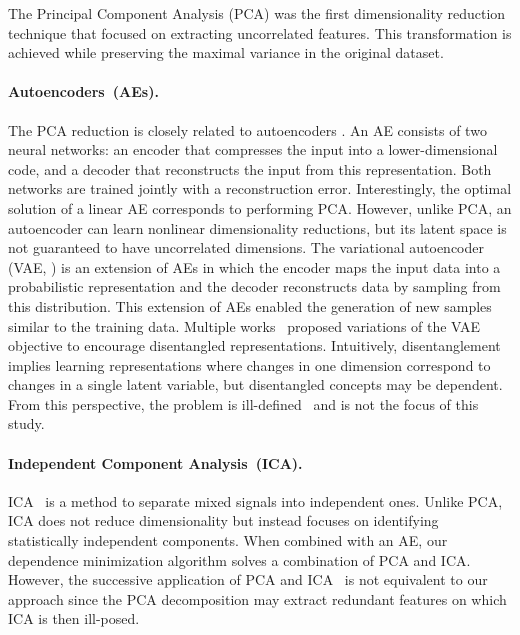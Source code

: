 The Principal Component Analysis (PCA) was the first dimensionality reduction technique that focused on extracting uncorrelated features. 
This transformation is achieved while preserving the maximal variance in the original dataset.

\paragraph{Autoencoders~(AEs).} The PCA reduction is closely related to autoencoders \citep{kramer1991autoencoder_nlpca, rumelhart1986ae_structure}. 
An AE consists of two neural networks: an encoder that compresses the input into a lower-dimensional code, and a decoder that reconstructs the input from this representation. 
Both networks are trained jointly with a reconstruction error. 
Interestingly, the optimal solution of a linear AE corresponds to performing PCA. 
However, unlike PCA, an autoencoder can learn nonlinear dimensionality reductions, but its latent space is not guaranteed to have uncorrelated dimensions. 
The variational autoencoder (VAE, \cite{kingma2013VAE}) is an extension of AEs in which the encoder maps the input data into a probabilistic representation and the decoder reconstructs data by sampling from this distribution. %
This extension of AEs enabled the generation of new samples similar to the training data. 
Multiple works~\citep{higgins2022beta_vae, burgess2018understand_beta_vae, kim2018factor_vae, chen2018tc_vae} proposed variations of the VAE objective to encourage disentangled representations. Intuitively, disentanglement implies learning representations where changes in one dimension correspond to changes in a single latent variable, but disentangled concepts may be dependent. 
From this perspective, the problem is ill-defined~\citep{locatello2019challenging_disentanglement} and is not the focus of this study. 

\paragraph{Independent Component Analysis~(ICA).} 
ICA~\citep{jutten1991ica_bss} is a method to separate mixed signals into independent ones. Unlike PCA, ICA does not reduce dimensionality but instead focuses on identifying statistically independent components. 
When combined with an AE, our dependence minimization algorithm solves a combination of PCA and ICA. 
However, the successive application of PCA and ICA~\citep{back1997IPCA_first,yao2012ipca_later} is not equivalent to our approach since the PCA decomposition may extract redundant features on which ICA is then ill-posed. 

